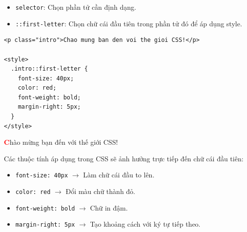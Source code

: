 \documentclass[11pt,oneside]{book}
\newcommand{\codeinline}[1]{\textcolor{accentOrange}{\texttt{#1}}}
\begin{document}
\begin{conceptBox}
\begin{itemize}[leftmargin=1.5em, itemsep=3pt, parsep=0pt]
    \item \codeinline{selector}: Chọn phần tử cần định dạng.
    \item \codeinline{::first-letter}: Chọn chữ cái đầu tiên trong phần tử đó để áp dụng style.
\end{itemize}
\end{conceptBox}

\begin{codeWindow}
\begin{lstlisting}[language=HTML5]
<p class="intro">Chao mung ban den voi the gioi CSS!</p>

<style>
  .intro::first-letter {
    font-size: 40px;
    color: red;
    font-weight: bold;
    margin-right: 5px;
  }
</style>
\end{lstlisting}
\end{codeWindow}

\begin{browserWindow}
\sffamily\small
\textbf{\Huge\textcolor{red}{C}}hào mừng bạn đến với thế giới CSS!
\end{browserWindow}

\begin{conceptBox}
Các thuộc tính áp dụng trong CSS sẽ ảnh hưởng trực tiếp đến chữ cái đầu tiên:
\begin{itemize}[leftmargin=1.5em, itemsep=3pt, parsep=0pt]
    \item \codeinline{font-size: 40px} $\rightarrow$ Làm chữ cái đầu to lên.
    \item \codeinline{color: red} $\rightarrow$ Đổi màu chữ thành đỏ.
    \item \codeinline{font-weight: bold} $\rightarrow$ Chữ in đậm.
    \item \codeinline{margin-right: 5px} $\rightarrow$ Tạo khoảng cách với ký tự tiếp theo.
\end{itemize}
\end{conceptBox}
\end{document}
